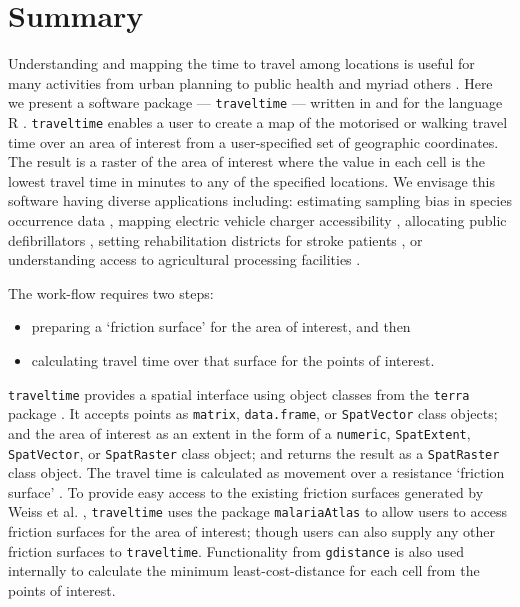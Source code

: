 \documentclass[
  10pt,
  letterpaper,
]{article}
\providecommand{\tightlist}{%
  \setlength{\itemsep}{0pt}\setlength{\parskip}{0pt}}\usepackage{longtable,booktabs,array}
\begin{document}

\section{Summary}\label{summary}

Understanding and mapping the time to travel among locations is useful
for many activities from urban planning \citep{zahavi1974traveltime} to
public health \citep{hulland2019travel, weiss2020global} and myriad
others \citep{nelson2019suite}. Here we present a software package ---
\texttt{traveltime} --- written in and for the language R \citep{Rref}.
\texttt{traveltime} enables a user to create a map of the motorised or
walking travel time over an area of interest from a user-specified set
of geographic coordinates. The result is a raster of the area of
interest where the value in each cell is the lowest travel time in
minutes to any of the specified locations. We envisage this software
having diverse applications including: estimating sampling bias in
species occurrence data \citep{dennis2000bias, reddy2003geographical},
mapping electric vehicle charger accessibility
\citep{falchetta2021electric}, allocating public defibrillators
\citep{tierney2018novel}, setting rehabilitation districts for stroke
patients \citep{padgham2019introduction}, or understanding access to
agricultural processing facilities \citep{zhao2023replanting}.

The work-flow requires two steps:

\begin{itemize}
\tightlist
\item
  preparing a `friction surface' for the area of interest, and then
\item
  calculating travel time over that surface for the points of interest.
\end{itemize}

\texttt{traveltime} provides a spatial interface using object classes
from the \texttt{terra} package \citep{terra}. It accepts points as
\texttt{matrix}, \texttt{data.frame}, or \texttt{SpatVector} class
objects; and the area of interest as an extent in the form of a
\texttt{numeric}, \texttt{SpatExtent}, \texttt{SpatVector}, or
\texttt{SpatRaster} class object; and returns the result as a
\texttt{SpatRaster} class object. The travel time is calculated as
movement over a resistance `friction surface' \citep{gdistance2017}. To
provide easy access to the existing friction surfaces generated by
Weiss et al. \citep{weiss2020global}, \texttt{traveltime} uses the package
\texttt{malariaAtlas} to allow users to access friction surfaces for the
area of interest; though users can also supply any other friction
surfaces to \texttt{traveltime}. Functionality from \texttt{gdistance}
\citep{gdistance2017} is also used internally to calculate the minimum
least-cost-distance for each cell from the points of interest.
\end{document}
